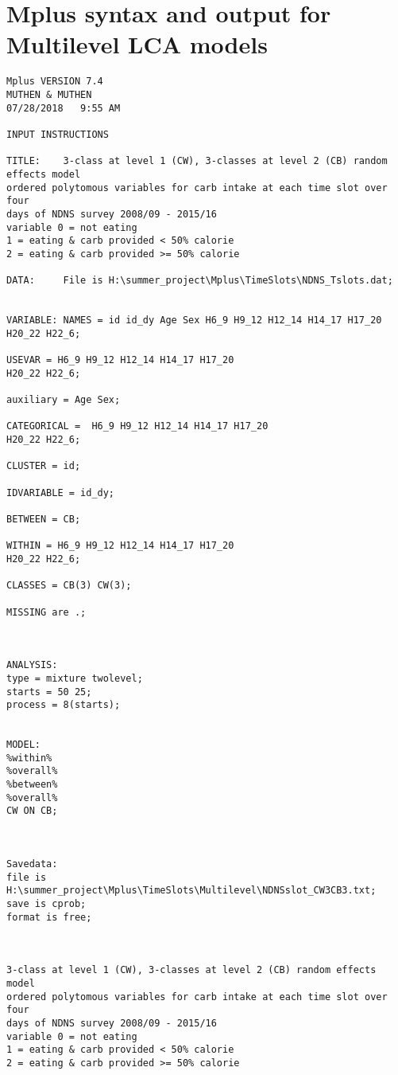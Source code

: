 
\chapter{Mplus syntax and output for Multilevel LCA models} %

\label{AppendixB} %



\begin{verbatim}
Mplus VERSION 7.4
MUTHEN & MUTHEN
07/28/2018   9:55 AM

INPUT INSTRUCTIONS

TITLE:    3-class at level 1 (CW), 3-classes at level 2 (CB) random effects model 
ordered polytomous variables for carb intake at each time slot over four
days of NDNS survey 2008/09 - 2015/16
variable 0 = not eating
1 = eating & carb provided < 50% calorie
2 = eating & carb provided >= 50% calorie

DATA:     File is H:\summer_project\Mplus\TimeSlots\NDNS_Tslots.dat;


VARIABLE: NAMES = id id_dy Age Sex H6_9 H9_12 H12_14 H14_17 H17_20
H20_22 H22_6;

USEVAR = H6_9 H9_12 H12_14 H14_17 H17_20
H20_22 H22_6;

auxiliary = Age Sex;

CATEGORICAL =  H6_9 H9_12 H12_14 H14_17 H17_20
H20_22 H22_6;

CLUSTER = id;

IDVARIABLE = id_dy;

BETWEEN = CB;

WITHIN = H6_9 H9_12 H12_14 H14_17 H17_20
H20_22 H22_6;

CLASSES = CB(3) CW(3);

MISSING are .;



ANALYSIS:
type = mixture twolevel;
starts = 50 25;
process = 8(starts);


MODEL:
%within%
%overall%
%between%
%overall%
CW ON CB;



Savedata:
file is H:\summer_project\Mplus\TimeSlots\Multilevel\NDNSslot_CW3CB3.txt;
save is cprob;
format is free;



3-class at level 1 (CW), 3-classes at level 2 (CB) random effects model 
ordered polytomous variables for carb intake at each time slot over four
days of NDNS survey 2008/09 - 2015/16
variable 0 = not eating
1 = eating & carb provided < 50% calorie
2 = eating & carb provided >= 50% calorie


\end{verbatim}
